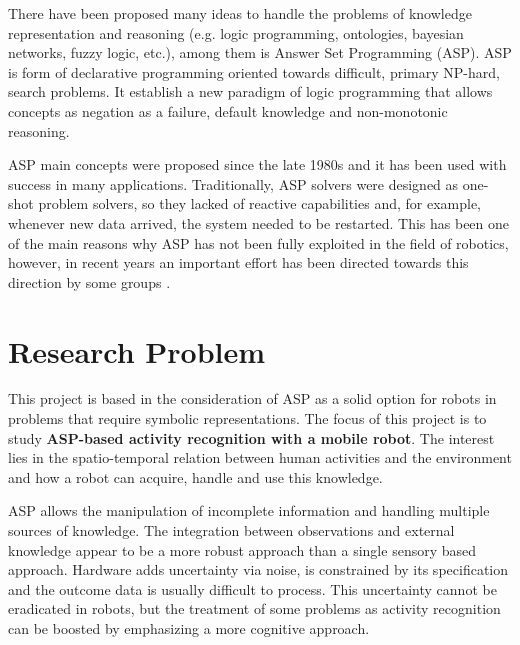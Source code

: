 There have been proposed many ideas to handle the problems of knowledge representation and reasoning (e.g. logic programming, ontologies, bayesian networks, fuzzy logic, etc.), among them is Answer Set Programming (ASP).
ASP is form of declarative programming oriented towards difficult, primary NP-hard, search problems.
It establish a new paradigm of logic programming that allows concepts as negation as a failure, default knowledge and non-monotonic reasoning.

ASP main concepts were proposed since the late 1980s \citep{Gelf88a} and it has been used with success in many applications.
Traditionally, ASP solvers were designed as one-shot problem solvers, so they lacked of reactive capabilities and, for example, whenever new data arrived, the system needed to be restarted.
This has been one of the main reasons why ASP has not been fully exploited in the field of robotics, however, in recent years an important effort has been directed towards this direction by some groups \citep{AndresOSSR13_rosoclingo,Erdem2013_IntLowRTaskP}.


\section{Research Problem}

This project is based in the consideration of ASP as a solid option for robots in problems that require symbolic representations.
The focus of this project is to study \textbf{ASP-based activity recognition with a mobile robot}. The interest lies  in the spatio-temporal relation between human activities and the environment and how a robot can acquire, handle and use this knowledge.

ASP allows the manipulation of incomplete information and handling multiple sources of knowledge.
The integration between observations and external knowledge appear to be a more robust approach than a single sensory based approach.
Hardware adds uncertainty via noise, is constrained by its specification and the outcome data is usually difficult to process.
This uncertainty cannot be eradicated in robots, but the treatment of some problems as activity recognition can be boosted by emphasizing a more cognitive approach. 

